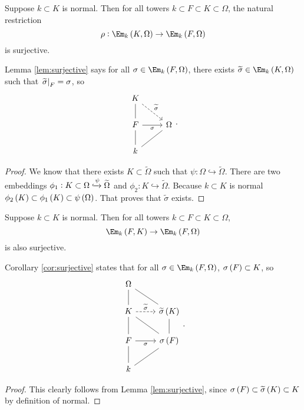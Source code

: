 \begin{lemma}
\label{lem:surjective}
Suppose $ k \subset K $ is normal. Then for all towers $ k \subset F \subset K \subset \Omega $, the natural restriction
$$ \rho : \Em_k\br{K, \Omega} \to \Em_k\br{F, \Omega} $$
is surjective.
\end{lemma}


Lemma \ref{lem:surjective} says for all $ \sigma \in \Em_k\br{F, \Omega} $, there exists $ \widetilde{\sigma} \in \Em_k\br{K, \Omega} $ such that $ \left. \widetilde{\sigma} \right|_F = \sigma $, so
$$
\begin{tikzcd}
K \arrow[dashed]{dr}{\widetilde{\sigma}} & \\
F \arrow[dash]{u} \arrow{r}[swap]{\sigma} & \Omega \\
k \arrow[dash]{u} \arrow[dash]{ur} &
\end{tikzcd}.
$$

\begin{proof}
We know that there exists $ K \subset \widetilde{\Omega} $ such that $ \psi : \Omega \hookrightarrow \widetilde{\Omega} $. There are two embeddings $ \phi_1 : K \subset \Omega \xhookrightarrow{\psi} \widetilde{\Omega} $ and $ \phi_2 : K \hookrightarrow \widetilde{\Omega} $. Because $ k \subset K $ is normal $ \phi_2\br{K} \subset \phi_1\br{K} \subset \psi\br{\Omega} $. That proves that $ \widetilde{\sigma} $ exists.
\end{proof}

\begin{corollary}
\label{cor:surjective}
Suppose $ k \subset K $ is normal. Then for all towers $ k \subset F \subset K \subset \Omega $,
$$ \Em_k\br{F, K} \to \Em_k\br{F, \Omega} $$
is also surjective.
\end{corollary}

Corollary \ref{cor:surjective} states that for all $ \sigma \in \Em_k\br{F, \Omega} $, $ \sigma\br{F} \subset K $, so
$$
\begin{tikzcd}
\Omega & \\
K \arrow[dash]{u} \arrow[dashed]{r}{\widetilde{\sigma}} & \widetilde{\sigma}\br{K} \arrow[dash]{ul} \\
F \arrow[dash]{u} \arrow{r}[swap]{\sigma} & \sigma\br{F} \arrow[dash]{ul} \arrow[dash]{u} \\
k \arrow[dash]{u} \arrow[dash]{ur} &
\end{tikzcd}.
$$

\begin{proof}
This clearly follows from Lemma \ref{lem:surjective}, since $ \sigma\br{F} \subset \widetilde{\sigma}\br{K} \subset K $ by definition of normal.
\end{proof}

